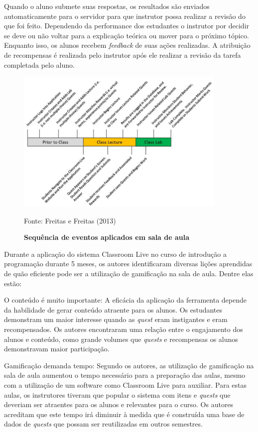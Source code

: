 \documentclass[
	12pt,				%
	oneside,			%
	a4paper,			%
	english,			%
	french,				%
	spanish,			%
	brazil,				%
	]{abntex2}
\begin{document}
Quando o aluno submete suas respostas, os resultados são enviados automaticamente para o servidor para que instrutor possa realizar a revisão do que foi feito. Dependendo da performance dos estudantes o instrutor por decidir se deve ou não voltar para a explicação teórica ou mover para o próximo tópico. Enquanto isso, os alunos recebem \textit{feedback} de suas ações realizadas. A atribuição de recompensas é realizada pelo instrutor após ele realizar a revisão da tarefa completada pelo aluno.

\begin{figure}[ht]
\centering
\caption{\textbf{Sequência de eventos aplicados em sala de aula}}
\includegraphics[width=0.9\textwidth]{imagens/classroom_aula.png}

Fonte: Freitas e Freitas (2013)
\label{fig:classroom_aula}
\end{figure}

Durante a aplicação do sistema Classroom Live no curso de introdução a programação durante 5 meses, os autores identificaram diversas lições aprendidas de quão eficiente pode ser a utilização de gamificação na sala de aula. Dentre elas estão:

O conteúdo é muito importante: A eficácia da aplicação da ferramenta depende da habilidade de gerar conteúdo atraente para os alunos. Os estudantes demonstram um maior interesse quando as \textit{quest} eram instigantes e eram recompensados. Os autores encontraram uma relação entre o engajamento dos alunos e conteúdo, como grande volumes que \textit{quests} e recompensas os alunos demonstravam maior participação.

Gamificação demanda tempo: Segundo os autores, as utilização de gamificação na sala de aula aumentou o tempo necessário para a preparação das aulas, mesmo com a utilização de um software como Classroom Live para auxiliar. Para estas aulas, os instrutores tiveram que popular o sistema com itens e \textit{quests} que deveriam ser atraentes para os alunos e relevantes para o curso. Os autores acreditam que este tempo irá diminuir à medida que é construída uma base de dados de \textit{quests} que possam ser reutilizadas em outros semestres.
\end{document}
